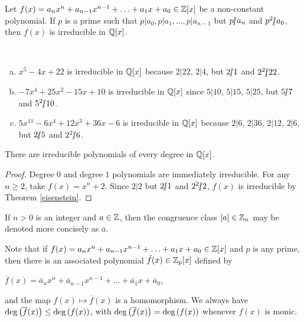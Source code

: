 \documentclass[11pt,fleqn,dvipsnames,usenames]{article}
\newcommand{\p}{\noindent}
\begin{document}
%
\begin{theorem}
Let $f(x) = a_{n}x^{n} + a_{n-1}x^{n-1} + \ldots + a_{1}x + a_{0}\in\mathbb{Z}[x]$ be a non-constant polynomial.  If $p$ is a prime such that $p|a_{0},p|a_{1},\ldots,p|a_{n-1}$ but $p|\kern-0.9ex{/} a_{n}$ and $p^2|\kern-0.9ex{/} a_{0}$, then $f(x)$ is irreducible in $\mathbb{Q}[x]$.
\end{theorem}
%
\begin{examples}\label{eisenstein}~
\begin{enumerate}[(a)]
\item $x^5 - 4x + 22$ is irreducible in $\mathbb{Q}[x]$ because $2|22$, $2|4$, but $2|\kern-0.9ex{/} 1$ and $2^2|\kern-0.9ex{/} 22$.
\item $-7x^4 + 25x^2 - 15x + 10$ is irreducible in $\mathbb{Q}[x]$ since $5|10$, $5|15$, $5|25$, but $5|\kern-0.9ex{/} 7$ and $5^2|\kern-0.9ex{/} 10$.
\item $5x^11 - 6x^4 + 12x^3 + 36x - 6$ is irreducible in $\mathbb{Q}[x]$ because $2|6$, $2|36$, $2|12$, $2|6$, but $2|\kern-0.9ex{/} 5$ and $2^2|\kern-0.9ex{/} 6$.
\end{enumerate}
\end{examples}
%
\begin{corollary}
There are irreducible polynomials of every degree in $\mathbb{Q}[x]$.
\end{corollary}
%
\begin{proof}
Degree $0$ and degree $1$ polynomials are immediately irreducible.  For any $n\geq 2$, take $f(x) = x^n + 2$.  Since $2|2$ but $2|\kern-0.9ex{/} 1$ and $2^2|\kern-0.9ex{/} 2$, $f(x)$ is irreducible by Theorem \ref{eisenstein}.
\end{proof}

%
\notation If $n > 0$ is an integer and $a\in\mathbb{Z}$, then the congruence class $[a]\in\mathbb{Z}_{n}$ may be denoted more concisely as $\overline{a}$.
\vsp

\p Note that if $f(x) = a_{n}x^{n} + a_{n-1}x^{n-1} + \ldots + a_{1}x + a_{0}\in\mathbb{Z}[x]$ and $p$ is any prime, then there is an associated polynomial $\tilde{f}(x)\in\mathbb{Z}_{p}[x]$ defined by
\begin{center}
$\overline{f}(x) = \overline{a}_{n}x^{n} + \overline{a}_{n-1}x^{n-1} + \ldots + \overline{a}_{1}x + \overline{a}_{0}$,
\end{center}
\p and the map $f(x)\mapsto \overline{f}(x)$ is a homomorphism.  We always have $\text{deg}\left(\overline{f}(x)\right)\leq \text{deg}\left(f(x)\right)$, with $\text{deg}\left(\overline{f}(x)\right)=\text{deg}\left(f(x)\right)$ whenever $f(x)$ is monic.
\end{document}
